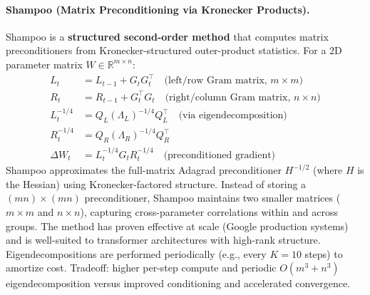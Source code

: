 \paragraph{Shampoo (Matrix Preconditioning via Kronecker Products).}
Shampoo is a \textbf{structured second-order method} that computes matrix preconditioners from Kronecker-structured outer-product statistics. For a 2D parameter matrix $W \in \mathbb{R}^{m \times n}$:
\begin{align}
L_t &= L_{t-1} + G_t G_t^\top \quad\text{(left/row Gram matrix, $m \times m$)} \\
R_t &= R_{t-1} + G_t^\top G_t \quad\text{(right/column Gram matrix, $n \times n$)} \\
L_t^{-1/4} &= Q_L (\Lambda_L)^{-1/4} Q_L^\top \quad\text{(via eigendecomposition)} \\
R_t^{-1/4} &= Q_R (\Lambda_R)^{-1/4} Q_R^\top \\
\Delta W_t &= L_t^{-1/4} G_t R_t^{-1/4} \quad\text{(preconditioned gradient)}
\end{align}
Shampoo approximates the full-matrix Adagrad preconditioner $H^{-1/2}$ (where $H$ is the Hessian) using Kronecker-factored structure. Instead of storing a $(mn) \times (mn)$ preconditioner, Shampoo maintains two smaller matrices ($m \times m$ and $n \times n$), capturing cross-parameter correlations within and across groups. The method has proven effective at scale (Google production systems) and is well-suited to transformer architectures with high-rank structure. Eigendecompositions are performed periodically (e.g., every $K=10$ steps) to amortize cost. Tradeoff: higher per-step compute and periodic $O(m^3 + n^3)$ eigendecomposition versus  improved conditioning and accelerated convergence.

